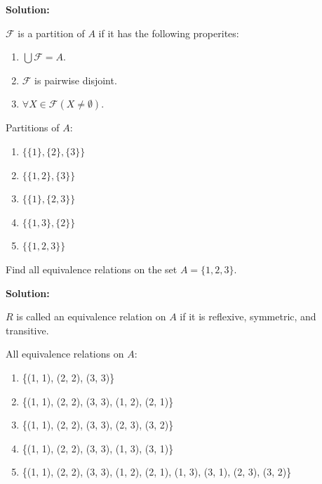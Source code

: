 \textbf{Solution:}

$\mathcal{F}$ is a partition of $A$ if it has the following properites:
\begin{enumerate}
    \item $\bigcup \mathcal{F} = A$.
    \item $\mathcal{F}$ is pairwise disjoint.
    \item $\forall{X \in \mathcal{F}}(X \not = \emptyset)$.
\end{enumerate}

Partitions of $A$:
\begin{enumerate}
    \item $\{\{1\}, \{2\}, \{3\}\}$
    \item $\{\{1, 2\}, \{3\}\}$
    \item $\{\{1\}, \{2, 3\}\}$
    \item $\{\{1, 3\}, \{2\}\}$
    \item $\{\{1, 2, 3\}\}$
\end{enumerate}

\begin{tcolorbox}[title=Problem 2, breakable]
    Find all equivalence relations on the set $A = \{1, 2, 3\}$.
\end{tcolorbox}

\textbf{Solution:}

$R$ is called an equivalence relation on $A$ if it is reflexive,
    symmetric, and transitive.

All equivalence relations on $A$:
\begin{enumerate}
    \item \{(1, 1), (2, 2), (3, 3)\}
    \item \{(1, 1), (2, 2), (3, 3), (1, 2), (2, 1)\}
    \item \{(1, 1), (2, 2), (3, 3), (2, 3), (3, 2)\}
    \item \{(1, 1), (2, 2), (3, 3), (1, 3), (3, 1)\}
    \item \{(1, 1), (2, 2), (3, 3), (1, 2), (2, 1), (1, 3), (3, 1), (2, 3), (3, 2)\}
\end{enumerate}